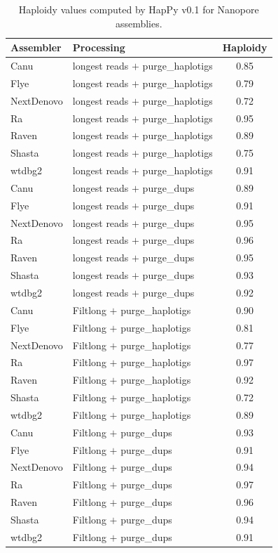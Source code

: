 \begin{table}[ht]
\centering
\caption{Haploidy values computed by HapPy v0.1 for Nanopore assemblies.}
\begin{tabular}{llc}
\hline
\textbf{Assembler} & \textbf{Processing} & \textbf{Haploidy} \\
\hline
Canu & longest reads $+$ purge\_haplotigs & 0.85 \\
Flye & longest reads $+$ purge\_haplotigs & 0.79 \\
NextDenovo & longest reads $+$ purge\_haplotigs & 0.72 \\
Ra & longest reads $+$ purge\_haplotigs & 0.95 \\
Raven & longest reads $+$ purge\_haplotigs & 0.89 \\
Shasta & longest reads $+$ purge\_haplotigs & 0.75 \\
wtdbg2 & longest reads $+$ purge\_haplotigs & 0.91 \\
Canu & longest reads $+$ purge\_dups & 0.89 \\
Flye & longest reads $+$ purge\_dups & 0.91 \\
NextDenovo & longest reads $+$ purge\_dups & 0.95 \\
Ra & longest reads $+$ purge\_dups & 0.96 \\
Raven & longest reads $+$ purge\_dups & 0.95 \\
Shasta & longest reads $+$ purge\_dups & 0.93 \\
wtdbg2 & longest reads $+$ purge\_dups & 0.92 \\
Canu & Filtlong $+$ purge\_haplotigs & 0.90 \\
Flye & Filtlong $+$ purge\_haplotigs & 0.81 \\
NextDenovo & Filtlong $+$ purge\_haplotigs & 0.77 \\
Ra & Filtlong $+$ purge\_haplotigs & 0.97 \\
Raven & Filtlong $+$ purge\_haplotigs & 0.92 \\
Shasta & Filtlong $+$ purge\_haplotigs & 0.72 \\
wtdbg2 & Filtlong $+$ purge\_haplotigs & 0.89 \\
Canu & Filtlong $+$ purge\_dups & 0.93 \\
Flye & Filtlong $+$ purge\_dups & 0.91 \\
NextDenovo & Filtlong $+$ purge\_dups & 0.94 \\
Ra & Filtlong $+$ purge\_dups & 0.97 \\
Raven & Filtlong $+$ purge\_dups & 0.96 \\
Shasta & Filtlong $+$ purge\_dups & 0.94 \\
wtdbg2 & Filtlong $+$ purge\_dups & 0.91 \\
\hline
\end{tabular}
\label{tab:nanopore_happy_part2}
\end{table}

